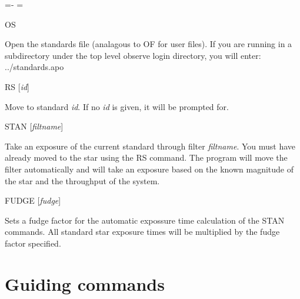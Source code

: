 \documentclass[10pt]{report}
\newenvironment{hanging}{
	\begin{list}{}{
		\labelsep=0pt
		\labelwidth=0pt
		\listparindent=0pt
		\itemindent=-\leftmargini
		\leftmargin=\leftmargini
	}
}{
	\end{list}
}
\begin{document}
\begin{hanging}

\item{OS}

Open the standards file (analagous to OF for user files). 
If you are running in a subdirectory under the
top level observe login directory, you will enter: ../standards.apo

\item{RS [{\it id}]}

Move to standard {\it id}. If no {\it id} is given, it will be prompted for.

\item{STAN [\textit{filtname}]}

Take an exposure of the current standard through filter \textit{filtname}. You
must have already moved to the star using the RS command. The program will move
the filter automatically and will take an exposure based on the known
magnitude of the star and the throughput of the system.

\item{FUDGE [\textit{fudge}]}

Sets a fudge factor for the automatic expossure time calculation of the STAN
commands. All standard star exposure times will be multiplied by the fudge
factor specified. 

%
%
%

\end{hanging}

\section{Guiding commands}
\end{document}
